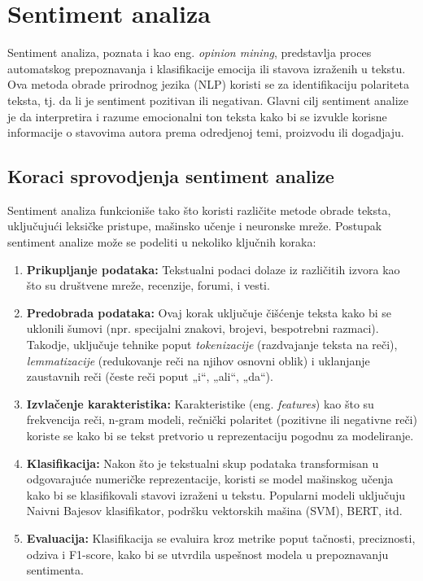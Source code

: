 \documentclass{article}
\begin{document}
\newpage
\section{Sentiment analiza}

Sentiment analiza, poznata i kao eng. \textit{opinion mining}, predstavlja proces automatskog prepoznavanja i klasifikacije emocija ili stavova izraženih u tekstu. Ova metoda obrade prirodnog jezika (NLP) koristi se za identifikaciju polariteta teksta, tj. da li je sentiment pozitivan ili negativan. Glavni cilj sentiment analize je da interpretira i razume emocionalni ton teksta kako bi se izvukle korisne informacije o stavovima autora prema odredjenoj temi, proizvodu ili dogadjaju.

\subsection{Koraci sprovodjenja sentiment analize}

Sentiment analiza funkcioniše tako što koristi različite metode obrade teksta, uključujući leksičke pristupe, mašinsko učenje i neuronske mreže. Postupak sentiment analize može se podeliti u nekoliko ključnih koraka:

\begin{enumerate}
    \item \textbf{Prikupljanje podataka:} Tekstualni podaci dolaze iz različitih izvora kao što su društvene mreže, recenzije, forumi, i vesti. 
    
    \item \textbf{Predobrada podataka:} Ovaj korak uključuje čišćenje teksta kako bi se uklonili šumovi (npr. specijalni znakovi, brojevi, bespotrebni razmaci). Takodje, uključuje tehnike poput \textit{tokenizacije} (razdvajanje teksta na reči), \textit{lemmatizacije} (redukovanje reči na njihov osnovni oblik) i uklanjanje zaustavnih reči (česte reči poput „i“, „ali“, „da“).
    
    \item \textbf{Izvlačenje karakteristika:} Karakteristike (eng. \textit{features}) kao što su frekvencija reči, n-gram modeli, rečnički polaritet (pozitivne ili negativne reči) koriste se kako bi se tekst pretvorio u reprezentaciju pogodnu za modeliranje.
    
    \item \textbf{Klasifikacija:} Nakon što je tekstualni skup podataka transformisan u odgovarajuće numeričke reprezentacije, koristi se model mašinskog učenja kako bi se klasifikovali stavovi izraženi u tekstu. Popularni modeli uključuju Naivni Bajesov klasifikator, podršku vektorskih mašina (SVM), BERT, itd.
    
    \item \textbf{Evaluacija:} Klasifikacija se evaluira kroz metrike poput tačnosti, preciznosti, odziva i F1-score, kako bi se utvrdila uspešnost modela u prepoznavanju sentimenta.
\end{enumerate}
\newpage
\end{document}
